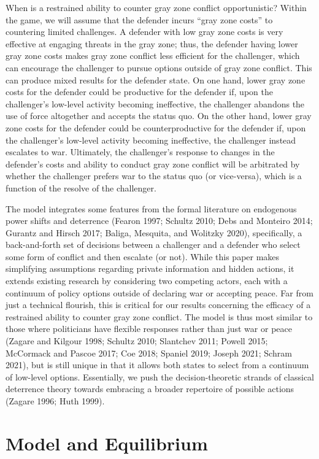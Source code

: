 \documentclass[
]{article}
\begin{document}
When is a restrained ability to counter gray zone conflict opportunistic? Within the game, we will assume that the defender incurs ``gray zone costs'' to countering limited challenges. A defender with low gray zone costs is very effective at engaging threats in the gray zone; thus, the defender having lower gray zone costs makes gray zone conflict less efficient for the challenger, which can encourage the challenger to pursue options outside of gray zone conflict. This can produce mixed results for the defender state. On one hand, lower gray zone costs for the defender could be productive for the defender if, upon the challenger's low-level activity becoming ineffective, the challenger abandons the use of force altogether and accepts the status quo. On the other hand, lower gray zone costs for the defender could be counterproductive for the defender if, upon the challenger's low-level activity becoming ineffective, the challenger instead escalates to war. Ultimately, the challenger's response to changes in the defender's costs and ability to conduct gray zone conflict will be arbitrated by whether the challenger prefers war to the status quo (or vice-versa), which is a function of the resolve of the challenger.

The model integrates some features from the formal literature on endogenous power shifts and deterrence (Fearon 1997; Schultz 2010; Debs and Monteiro 2014; Gurantz and Hirsch 2017; Baliga, Mesquita, and Wolitzky 2020), specifically, a back-and-forth set of decisions between a challenger and a defender who select some form of conflict and then escalate (or not). While this paper makes simplifying assumptions regarding private information and hidden actions, it extends existing research by considering two competing actors, each with a continuum of policy options outside of declaring war or accepting peace. Far from just a technical flourish, this is critical for our results concerning the efficacy of a restrained ability to counter gray zone conflict. The model is thus most similar to those where politicians have flexible responses rather than just war or peace (Zagare and Kilgour 1998; Schultz 2010; Slantchev 2011; Powell 2015; McCormack and Pascoe 2017; Coe 2018; Spaniel 2019; Joseph 2021; Schram 2021), but is still unique in that it allows both states to select from a continuum of low-level options. Essentially, we push the decision-theoretic strands of classical deterrence theory towards embracing a broader repertoire of possible actions (Zagare 1996; Huth 1999).

\hypertarget{model-and-equilibrium}{%
\section{Model and Equilibrium}\label{model-and-equilibrium}}
\end{document}
